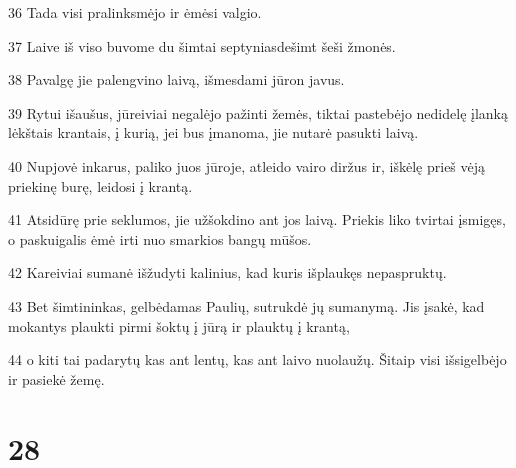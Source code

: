 \par 36 Tada visi pralinksmėjo ir ėmėsi valgio. 
\par 37 Laive iš viso buvome du šimtai septyniasdešimt šeši žmonės. 
\par 38 Pavalgę jie palengvino laivą, išmesdami jūron javus. 
\par 39 Rytui išaušus, jūreiviai negalėjo pažinti žemės, tiktai pastebėjo nedidelę įlanką lėkštais krantais, į kurią, jei bus įmanoma, jie nutarė pasukti laivą. 
\par 40 Nupjovė inkarus, paliko juos jūroje, atleido vairo diržus ir, iškėlę prieš vėją priekinę burę, leidosi į krantą. 
\par 41 Atsidūrę prie seklumos, jie užšokdino ant jos laivą. Priekis liko tvirtai įsmigęs, o paskuigalis ėmė irti nuo smarkios bangų mūšos. 
\par 42 Kareiviai sumanė išžudyti kalinius, kad kuris išplaukęs nepaspruktų. 
\par 43 Bet šimtininkas, gelbėdamas Paulių, sutrukdė jų sumanymą. Jis įsakė, kad mokantys plaukti pirmi šoktų į jūrą ir plauktų į krantą, 
\par 44 o kiti tai padarytų kas ant lentų, kas ant laivo nuolaužų. Šitaip visi išsigelbėjo ir pasiekė žemę.


\chapter{28}


